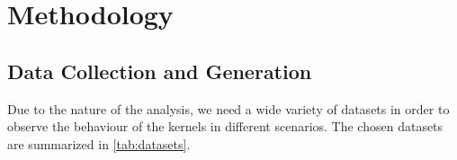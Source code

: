 





\section{Methodology}

\subsection{Data Collection and Generation}%

Due to the nature of the analysis, we need a wide variety of datasets in order
to observe the behaviour of the kernels in different scenarios. The chosen
datasets are summarized in \cref{tab:datasets}.

